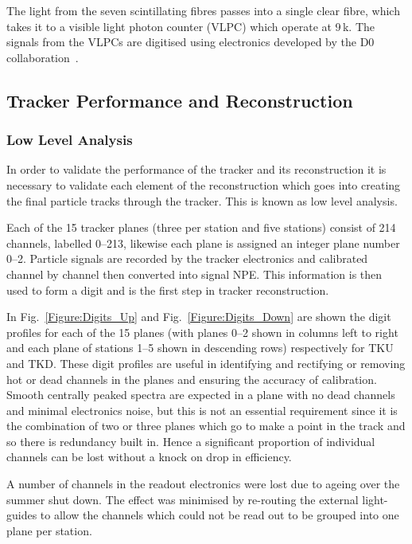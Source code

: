 The light from the seven scintillating fibres passes into a single clear fibre, which takes it to a visible light photon counter (VLPC) which operate at 9\,k. The signals from the VLPCs are digitised using electronics developed by the D0 collaboration~\cite{Abazov:2005pn}.


\subsection{Tracker Performance and Reconstruction}

\subsubsection{Low Level Analysis}

In order to validate the performance of the tracker and its reconstruction it is necessary to validate each element of the reconstruction which goes into creating the final particle tracks through the tracker. This is known as low level analysis.

Each of the 15 tracker planes (three per station and five stations) consist of 214 channels, labelled 0--213, likewise each plane is assigned an integer plane number 0--2. Particle signals are recorded by the tracker electronics and calibrated channel by channel then converted into signal NPE. This information is then used to form a digit and is the first step in tracker reconstruction.

In Fig.~\ref{Figure:Digits_Up} and Fig.~\ref{Figure:Digits_Down} are shown the digit profiles for each of the 15 planes (with planes 0--2 shown in columns left to right and each plane of stations 1--5 shown in descending rows) respectively for TKU and TKD. These digit profiles are useful in identifying and rectifying or removing hot or dead channels in the planes and ensuring the accuracy of calibration.  Smooth centrally peaked spectra are expected in a plane with no dead channels and minimal electronics noise, but this is not an essential requirement since it is the combination of two or three planes which go to make a point in the track and so there is redundancy built in.  Hence a significant proportion of individual channels can be lost without a knock on drop in efficiency. 

A number of channels in the readout electronics were lost due to ageing over the summer shut down. The effect was minimised by re-routing the external light-guides to allow the channels which could not be read out to be grouped into one plane per station.

